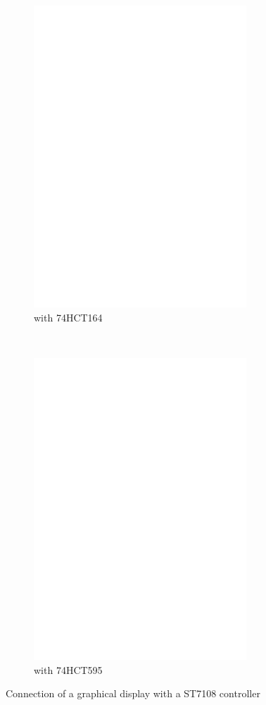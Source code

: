 \begin{figure}[H]
  \begin{subfigure}[b]{9cm}
    \centering
    \includegraphics[width=8cm]{../FIG/ST7108serial164.eps}
    \caption{with 74HCT164}
  \end{subfigure}
  ~
  \begin{subfigure}[b]{9cm}
    \centering
    \includegraphics[width=8cm]{../FIG/ST7108serial595.eps}
    \caption{with 74HCT595}
  \end{subfigure}
  \caption{Connection of a graphical display with a ST7108 controller}
  \label{fig:ST7108lcd}
\end{figure}

